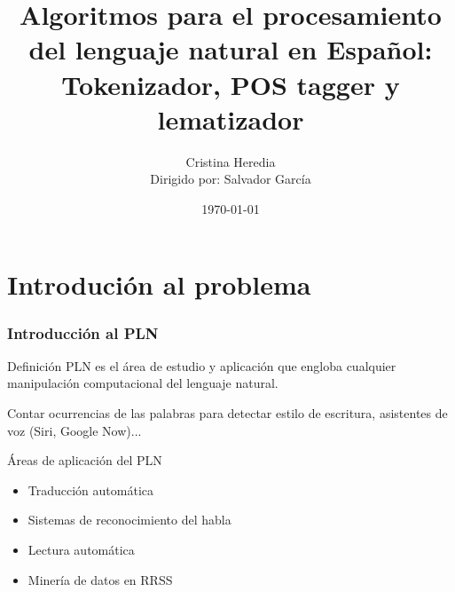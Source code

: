 \documentclass{beamer}
\title[Tokenizador, Pos tagger y lematizador]{Algoritmos para el procesamiento del lenguaje natural en Español: Tokenizador, POS tagger y lematizador} %
\author[Cristina Heredia]{Cristina Heredia\\{\normalsize Dirigido por: Salvador García}}
\institute[UGR] %
{
Trabajo fin de grado en Ingeniería informática \\ %
\medskip
\textit{Universidad de Granada} %
}
\date{\today} %
\begin{document}
\begin{frame}
\titlepage %
\end{frame}



\section{Introdución al problema } %


\begin{frame}
\frametitle{Introducción al PLN}
\begin{block}{Definición}
PLN es el área de estudio y aplicación que engloba cualquier manipulación computacional del lenguaje natural. 
\end{block}
\begin{example}
Contar ocurrencias de las palabras para detectar estilo de escritura, asistentes de voz (Siri, Google Now)...
\end{example}

\begin{block}{Áreas de aplicación del PLN}
\begin{scriptsize}
\begin{itemize}
\item Traducción automática
\item Sistemas de reconocimiento del habla
\item Lectura automática
\item Minería de datos en RRSS
\end{itemize}
\end{scriptsize}
\end{block}
\end{frame}
\end{document}
